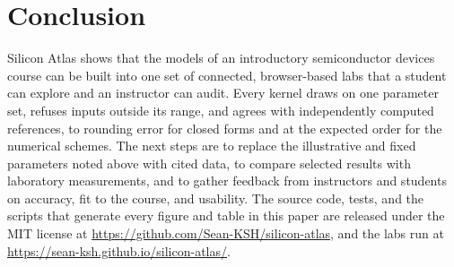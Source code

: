 \documentclass[conference]{IEEEtran}
\def\repourl{https://github.com/Sean-KSH/silicon-atlas}
\def\demourl{https://sean-ksh.github.io/silicon-atlas/}
\begin{document}
\section{Conclusion}
Silicon Atlas shows that the models of an introductory semiconductor devices course can be built into one set of connected, browser-based labs that a student can explore and an instructor can audit. Every kernel draws on one parameter set, refuses inputs outside its range, and agrees with independently computed references, to rounding error for closed forms and at the expected order for the numerical schemes. The next steps are to replace the illustrative and fixed parameters noted above with cited data, to compare selected results with laboratory measurements, and to gather feedback from instructors and students on accuracy, fit to the course, and usability. The source code, tests, and the scripts that generate every figure and table in this paper are released under the MIT license at \url{\repourl}, and the labs run at \url{\demourl}.



\end{document}
